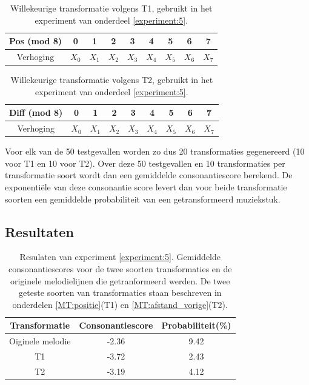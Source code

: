 \begin{table}
  \centering
  \begin{tabular}{c | c c c c c c c c }
    Pos (mod 8) & 0 & 1 & 2 & 3 & 4 & 5 & 6 & 7 \\
    \hline
    \hline
    Verhoging & $X_{0}$ & $X_{1}$ & $X_{2}$ & $X_{3}$ & $X_{4}$ & $X_{5}$ & $X_{6}$ & $X_{7}$ \\
  \end{tabular}
  \caption{Willekeurige transformatie volgens T1, gebruikt in het experiment van onderdeel \ref{experiment:5}.}
  \label{tabel:exp5:T1}
\end{table}

\begin{table}
  \centering
  \begin{tabular}{c | c c c c c c c c }
    Diff (mod 8) & 0 & 1 & 2 & 3 & 4 & 5 & 6 & 7 \\
    \hline
    \hline
    Verhoging & $X_{0}$ & $X_{1}$ & $X_{2}$ & $X_{3}$ & $X_{4}$ & $X_{5}$ & $X_{6}$ & $X_{7}$ \\
  \end{tabular}
  \caption{Willekeurige transformatie volgens T2, gebruikt in het experiment van onderdeel \ref{experiment:5}.}
  \label{tabel:exp5:T2}
\end{table}

Voor elk van de 50 testgevallen worden zo dus 20 transformaties gegenereerd (10 voor T1 en 10 voor T2). Over deze 50 testgevallen en 10 transformaties per transformatie soort wordt dan een gemiddelde consonantiescore berekend. De exponenti\"ele van deze consonantie score levert dan voor beide transformatie soorten een gemiddelde probabiliteit van een getransformeerd muziekstuk.

\subsection{Resultaten}

\begin{table}
  \centering
  \begin{tabular}{c | c c }    
    Transformatie & Consonantiescore & Probabiliteit(\%)\\
    \hline
    Oiginele melodie & -2.36 & 9.42\\
    T1 & -3.72 & 2.43\\
    T2 & -3.19 & 4.12\\
  \end{tabular}
  \caption{Resulaten van experiment \ref{experiment:5}. Gemiddelde consonantiescores voor de twee soorten transformaties en de originele melodielijnen die getranformeerd werden. De twee geteste soorten van transformaties staan beschreven in onderdelen \ref{MT:positie}(T1) en \ref{MT:afstand_vorige}(T2).}
  \label{tabel:res5}
\end{table}

